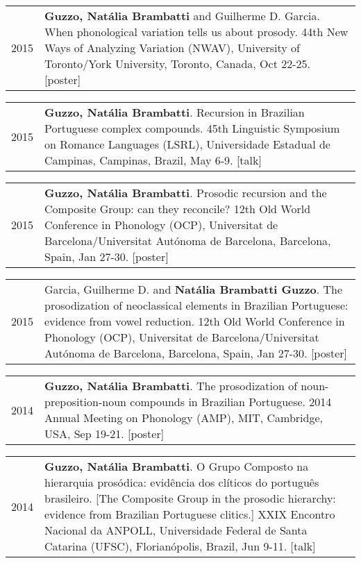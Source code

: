 \documentclass[letterpaper,10pt]{article}
\begin{document}
\begin{tabular}{p{1cm}p{16cm}}	
 2015 & \textbf{Guzzo, Nat\'alia Brambatti} and Guilherme D. Garcia. When phonological variation tells us about prosody. {44th New Ways of Analyzing Variation (NWAV)}, University of Toronto/York University, Toronto, Canada, Oct 22-25. [poster]%
 \end{tabular}

 
 \begin{tabular}{p{1cm}p{16cm}}
 2015   & \textbf{Guzzo, Nat\'alia Brambatti}. Recursion in Brazilian Portuguese complex compounds. {45th Linguistic Symposium on Romance Languages (LSRL)}, Universidade Estadual de Campinas, Campinas, Brazil, May 6-9. [talk] %
 \end{tabular}
 
 
 \begin{tabular}{p{1cm}p{16cm}}
 2015   & \textbf{Guzzo, Nat\'alia Brambatti}. Prosodic recursion and the Composite Group: can they reconcile? {12th Old World Conference in Phonology (OCP)}, Universitat de Barcelona/Universitat Aut\'onoma de Barcelona, Barcelona, Spain, Jan 27-30. [poster]%
 \end{tabular}
 
 
 \begin{tabular}{p{1cm}p{16cm}}
 2015   & Garcia, Guilherme D. and \textbf{Nat\'alia Brambatti Guzzo}. The prosodization of neoclassical elements in Brazilian Portuguese: evidence from vowel reduction.  {12th Old World Conference in Phonology (OCP)}, Universitat de Barcelona/Universitat Aut\'onoma de Barcelona, Barcelona, Spain, Jan 27-30. [poster]%
 \end{tabular}
 
 
 \begin{tabular}{p{1cm}p{16cm}}
 2014   & \textbf{Guzzo, Nat\'alia Brambatti}. The prosodization of noun-preposition-noun compounds in Brazilian Portuguese. 2014 Annual Meeting on Phonology (AMP), MIT, Cambridge, USA, Sep 19-21. [poster]%
 \end{tabular}
 
 
 \begin{tabular}{p{1cm}p{16cm}}
 2014   & \textbf{Guzzo, Nat\'alia Brambatti}. O Grupo Composto na hierarquia pros\'odica: evid\^encia dos cl\'i­ticos do portugu\^es brasileiro. [The Composite Group in the prosodic hierarchy: evidence from Brazilian Portuguese clitics.] {XXIX Encontro Nacional da ANPOLL}, Universidade Federal de Santa Catarina (UFSC), Florian\'opolis, Brazil, Jun 9-11. [talk] %
 \end{tabular}
 
\end{document}
